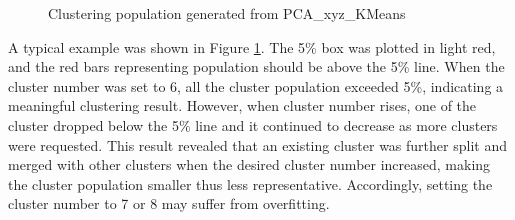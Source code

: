 \documentclass[a4paper]{article}
\begin{document}
\begin{figure}[H]
    \centering
    \caption{Clustering population generated from PCA\_xyz\_KMeans}
    \label{fig: clustering pop}
\end{figure}

A typical example was shown in Figure \ref{fig: clustering pop}. The 5\% box was plotted in light red, and the red bars representing population should be above the 5\% line. When the cluster number was set to 6, all the cluster population exceeded 5\%, indicating a meaningful clustering result. However, when cluster number rises, one of the cluster dropped below the 5\% line and it continued to decrease as more clusters were requested. This result revealed that an existing cluster was further split and merged with other clusters when the desired cluster number increased, making the cluster population smaller thus less representative. Accordingly, setting the cluster number to 7 or 8 may suffer from overfitting.
\end{document}

